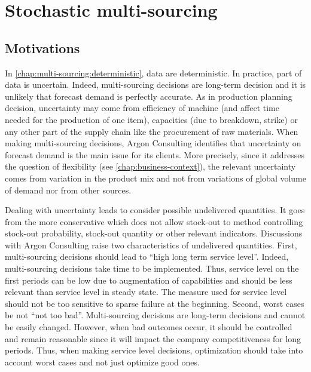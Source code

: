 \chapter{Stochastic multi-sourcing}
\label{chap:multi-sourcing:stochastic}


\section{Motivations}
\label{sec:multi-sourcing:stochastic:motivations}


In \cref{chap:multi-sourcing:deterministic}, data are deterministic.
In practice, part of data is uncertain.
Indeed, multi-sourcing decisions are long-term decision and it is unlikely that forecast demand is perfectly accurate.
As in production planning decision, uncertainty may come from efficiency of machine (and affect time needed for the production of one item), capacities (due to breakdown, strike) or any other part of the supply chain like the procurement of raw materials.
When making multi-sourcing decisions, Argon Consulting identifies that uncertainty on forecast demand is the main issue for its clients.
More precisely, since it addresses the question of flexibility (see \cref{chap:business-context}), the relevant uncertainty comes from variation in the product mix and not from variations of global volume of demand nor from other sources.


Dealing with uncertainty leads to consider possible undelivered quantities.
It goes from the more conservative which does not allow stock-out to method controlling stock-out probability, stock-out quantity or other relevant indicators.
Discussions with Argon Consulting raise two characteristics of undelivered quantities.
First, multi-sourcing decisions should lead to ``high long term service level''.
Indeed, multi-sourcing decisions take time to be implemented.
Thus, service level on the first periods can be low due to augmentation of capabilities and should be less relevant than service level in steady state.
The measure used for service level should not be too sensitive to sparse failure at the beginning.
Second, worst cases be not ``not too bad''.
Multi-sourcing decisions are long-term decisions and cannot be easily changed.
However, when bad outcomes occur, it should be controlled and remain reasonable since it will impact the company competitiveness for long periods.
Thus, when making service level decisions, optimization should take into account worst cases and not just optimize good ones.


